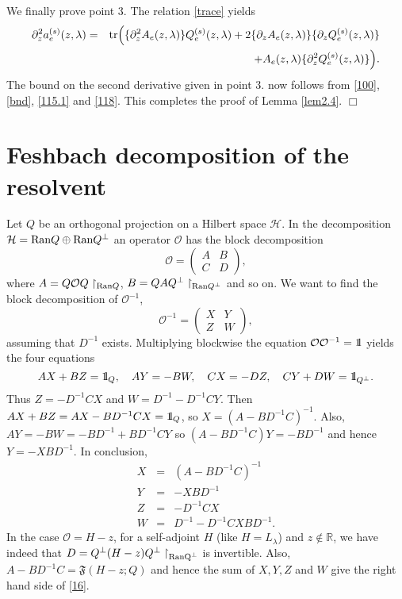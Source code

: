 \documentclass[letterpaper,onecolumn,11pt,accepted=2021-12-09]{quantumarticle}
\numberwithin{equation}{section}
\newcommand{\aes}{a_e^{(s)}}
\newcommand{\Qes}{Q_e^{(s)}}
\def\qed{\hfill $\Box$\medskip}
\newcommand{\bbbone}{\mathchoice {\rm 1\mskip-4mu l} {\rm 1\mskip-4mu l}
	{\rm 1\mskip-4.5mu l} {\rm 1\mskip-5mu l}}
\begin{document}
 We finally prove point 3.  The relation \eqref{trace} yields 
\begin{eqnarray*}
	\partial^2_z\aes(z,\lambda) &=& {\rm tr}\Big( \{\partial_z^2A_e(z,\lambda)\}\Qes(z,\lambda) + 2\{\partial_zA_e(z,\lambda)\}\{\partial_z \Qes(z,\lambda)\}\nonumber\\
	&& +  A_e(z,\lambda)\{\partial_z^2 \Qes(z,\lambda)\}\Big).
\end{eqnarray*}
The bound on the second derivative given in point 3. now follows from \eqref{100}, \eqref{bnd}, \eqref{115.1} and \eqref{118}. This completes the proof of  Lemma \ref{lem2.4}. \hfill \qed


\section{Feshbach decomposition of the resolvent}
\label{Fdecsect}

Let $Q$ be an orthogonal projection on a Hilbert space $\mathcal H$. In the decomposition ${\mathcal H}={\rm Ran}Q \oplus {\rm Ran}Q^\perp$ an operator ${\mathcal O}$ has the block decomposition
\begin{equation}
{\mathcal O}= 
\begin{pmatrix}
A & B\\
C & D
\end{pmatrix},
\end{equation}
where $A=Q{\mathcal O}Q\upharpoonright_{{\rm Ran}Q}$, $B=Q A Q^\perp\upharpoonright_{{\rm Ran}Q^\perp}$ and so on. We want to find the block decomposition of ${\mathcal O}^{-1}$, 
\begin{equation}
	{\mathcal O}^{-1}= 
	\begin{pmatrix}
		X & Y\\
		Z & W
	\end{pmatrix},
\end{equation}
assuming that $D^{-1}$ exists. Multiplying blockwise the equation ${\mathcal O}{\mathcal O}^{-1}=\bbbone$ yields the four equations
\begin{equation}
AX +BZ = \bbbone_Q, \quad AY = -BW, \quad CX = -DZ,\quad CY+DW = \bbbone_{Q^\perp}.
\label{f1}
\end{equation}
Thus $Z=-D^{-1}CX$ and $W = D^{-1}-D^{-1}CY$. Then $AX+BZ=AX-BD^{-1}CX=\bbbone_Q$, so $X=(A-BD^{-1}C)^{-1}$. Also, $AY=-BW=-BD^{-1} +BD^{-1}CY$ so $(A-BD^{-1}C)Y=-BD^{-1}$ and hence $Y=-XBD^{-1}$. In conclusion,
\begin{eqnarray*}
X &=& (A-BD^{-1}C)^{-1} \\
Y &=&-XBD^{-1}\\
Z &=& -D^{-1}CX\\
W &=& D^{-1}  -D^{-1} CXBD^{-1}.
\end{eqnarray*}
In the case ${\mathcal O}= H-z$,  for a self-adjoint $H$ (like  $H=L_\lambda$) and  $z\not\in\mathbb R$, we have indeed that $D=Q^\perp(H-z)Q^\perp\upharpoonright_{{\rm Ran Q}^\perp}$ is invertible. Also, $A-BD^{-1}C={\mathfrak F}(H-z;Q)$ and hence the sum of $X,Y,Z$ and $W$ give the right hand side of \eqref{16}.
\end{document}
